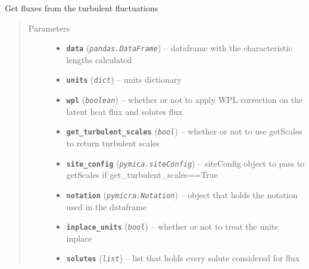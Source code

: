 \documentclass[a4paper,10pt,oneside]{sphinxmanual}
\begin{document}
\begin{fulllineitems}
\label{pymicra.micro:pymicra.micro.util.eddyCovariance}
Get fluxes from the turbulent fluctuations
\begin{quote}\begin{description}
\item[{Parameters}] \leavevmode\begin{itemize}
\item {} 
\textbf{\texttt{data}} (\emph{\texttt{pandas.DataFrame}}) -- dataframe with the characteristic lengths calculated

\item {} 
\textbf{\texttt{units}} (\emph{\texttt{dict}}) -- units dictionary

\item {} 
\textbf{\texttt{wpl}} (\emph{\texttt{boolean}}) -- whether or not to apply WPL correction on the latent heat flux and solutes flux

\item {} 
\textbf{\texttt{get\_turbulent\_scales}} (\emph{\texttt{bool}}) -- whether or not to use getScales to return turbulent scales

\item {} 
\textbf{\texttt{site\_config}} (\emph{\texttt{pymica.siteConfig}}) -- siteConfig object to pass to getScales if get\_turbulent\_scales==True

\item {} 
\textbf{\texttt{notation}} (\emph{\texttt{pymicra.Notation}}) -- object that holds the notation used in the dataframe

\item {} 
\textbf{\texttt{inplace\_units}} (\emph{\texttt{bool}}) -- whether or not to treat the units inplace

\item {} 
\textbf{\texttt{solutes}} (\emph{\texttt{list}}) -- list that holds every solute considered for flux

\end{itemize}

\end{description}\end{quote}

\end{fulllineitems}
\end{document}
